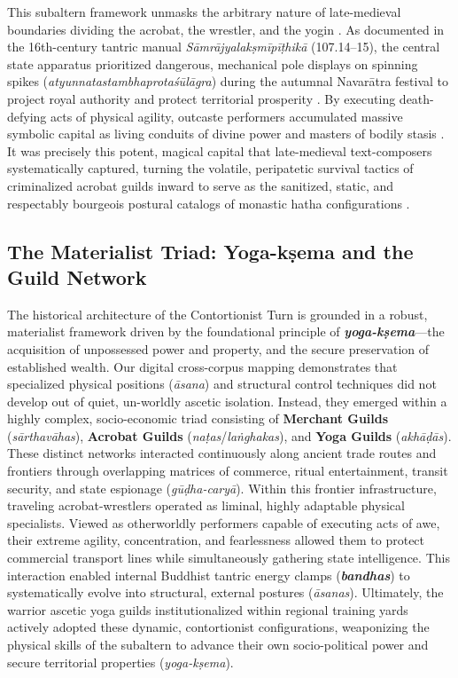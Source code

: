 \documentclass[11pt,letterpaper]{article}
\begin{document}
This subaltern framework unmasks the arbitrary nature of late-medieval boundaries dividing the acrobat, the wrestler, and the yogin \cite{McCartney2026c}. As documented in the 16th-century tantric manual \textit{Sāmrājyalakṣmīpīṭhikā} (107.14--15), the central state apparatus prioritized dangerous, mechanical pole displays on spinning spikes (\textit{atyunnatastambhaprotaśūlāgra}) during the autumnal Navarātra festival to project royal authority and protect territorial prosperity \cite{McCartney2026c}. By executing death-defying acts of physical agility, outcaste performers accumulated massive symbolic capital as living conduits of divine power and masters of bodily stasis \cite{McCartney2026c}. It was precisely this potent, magical capital that late-medieval text-composers systematically captured, turning the volatile, peripatetic survival tactics of criminalized acrobat guilds inward to serve as the sanitized, static, and respectably bourgeois postural catalogs of monastic hatha configurations \cite{Birch2024, McCartney2026c}.


\subsection{The Materialist Triad: Yoga-kṣema and the Guild Network}
The historical architecture of the Contortionist Turn is grounded in a robust, materialist framework driven by the foundational principle of \textbf{\textit{yoga-kṣema}}---the acquisition of unpossessed power and property, and the secure preservation of established wealth. Our digital cross-corpus mapping demonstrates that specialized physical positions (\textit{āsana}) and structural control techniques did not develop out of quiet, un-worldly ascetic isolation. Instead, they emerged within a highly complex, socio-economic triad consisting of \textbf{Merchant Guilds} (\textit{sārthavāhas}), \textbf{Acrobat Guilds} (\textit{naṭas}/\textit{laṅghakas}), and \textbf{Yoga Guilds} (\textit{akhāḍās}). These distinct networks interacted continuously along ancient trade routes and frontiers through overlapping matrices of commerce, ritual entertainment, transit security, and state espionage (\textit{gūḍha-caryā}). Within this frontier infrastructure, traveling acrobat-wrestlers operated as liminal, highly adaptable physical specialists. Viewed as otherworldly performers capable of executing acts of awe, their extreme agility, concentration, and fearlessness allowed them to protect commercial transport lines while simultaneously gathering state intelligence. This interaction enabled internal Buddhist tantric energy clamps (\textbf{\textit{bandhas}}) to systematically evolve into structural, external postures (\textit{āsanas}). Ultimately, the warrior ascetic yoga guilds institutionalized within regional training yards actively adopted these dynamic, contortionist configurations, weaponizing the physical skills of the subaltern to advance their own socio-political power and secure territorial properties (\textit{yoga-kṣema}).
\end{document}
